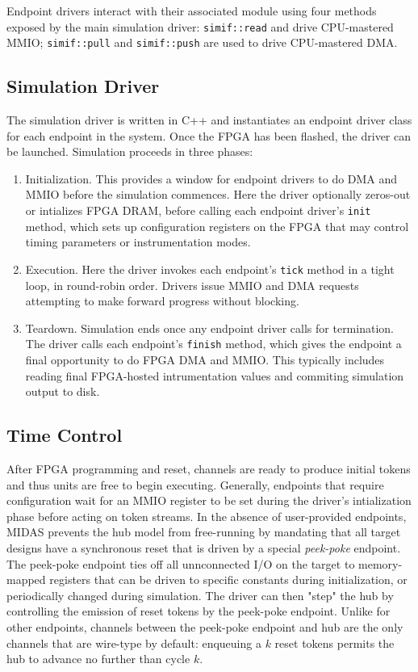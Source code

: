 Endpoint drivers interact with their associated module using four methods
exposed by the main simulation driver: \texttt{simif::read} and
 drive CPU-mastered MMIO; \texttt{simif::pull} and
\texttt{simif::push} are used to drive CPU-mastered DMA.

\subsection{Simulation Driver}

The simulation driver is written in C++ and instantiates an endpoint driver class for each endpoint
in the system. Once the FPGA has been flashed, the driver can be launched.
Simulation proceeds in three phases:

\begin{enumerate}
    \item Initialization. This provides a window for endpoint drivers to do DMA
        and MMIO before the simulation commences.  Here the driver optionally
        zeros-out or intializes FPGA DRAM, before calling each endpoint
        driver's \texttt{init} method, which sets up configuration registers on
        the FPGA that may control timing parameters or instrumentation modes.

    \item Execution. Here the driver invokes each endpoint's \texttt{tick}
        method in a tight loop, in round-robin order.  Drivers issue MMIO and
        DMA requests attempting to make forward progress without blocking.

    \item Teardown. Simulation ends once any endpoint driver calls for
        termination. The driver calls each endpoint's \texttt{finish} method,
        which gives the endpoint a final opportunity to do FPGA DMA and MMIO. This
        typically includes reading final FPGA-hosted intrumentation values and commiting simulation output to disk.
\end{enumerate}


\subsection{Time Control}
After FPGA programming and reset, channels are ready to produce initial tokens and thus units are free
to begin executing. Generally, endpoints that require
configuration wait for an MMIO register to be set during the driver's
intialization phase before acting on token streams. In the absence of
user-provided endpoints, MIDAS prevents the hub model from free-running by
mandating that all target designs have a synchronous reset that is driven
by a special \emph{peek-poke} endpoint. The peek-poke endpoint ties off all
unnconnected I/O on the target to memory-mapped registers
that can be driven to specific constants during initialization, or
periodically changed during simulation. The driver can then "step" the hub
by controlling the emission of reset tokens by the peek-poke endpoint.
Unlike for other endpoints, channels between the peek-poke endpoint and hub
are the only channels that are wire-type by default: enqueuing a $k$ reset
tokens permits the hub to advance no further than cycle $k$.


